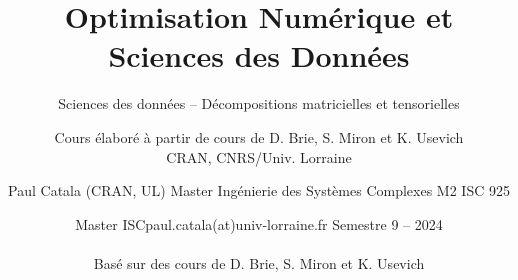 \documentclass[9pt]{beamer}
\author{Cours élaboré à partir de cours de D. Brie, S. Miron et K. Usevich \\CRAN, CNRS/Univ. Lorraine  }
\title{Optimisation Numérique et Sciences des Données}
\subtitle{Sciences des données -- Décompositions matricielles et tensorielles}
\date{Master ISC}
\author{Paul Catala (CRAN, UL) \hfill Master Ingénierie des Systèmes Complexes M2 ISC 925}
\date{paul.catala(at)univ-lorraine.fr \hfill Semestre 9 -- 2024 \\ \\ Basé sur des cours de D. Brie, S. Miron et K. Usevich}
\def\nvar{\mathrm{q}}
\begin{document}


\newcommand{\toclesssection}[1]{
  \setboolean{sectiontoc}{false}
  \section{#1}
  \setboolean{sectiontoc}{true}
}





\makeatletter
\newcommand{\xdashrightarrow}[2][]{\ext@arrow 0359\rightarrowfill@@{#1}{#2}}
\newcommand{\xdashleftarrow}[2][]{\ext@arrow 3095\leftarrowfill@@{#1}{#2}}
\newcommand{\xdashleftrightarrow}[2][]{\ext@arrow 3359\leftrightarrowfill@@{#1}{#2}}
\def\rightarrowfill@@{\arrowfill@@\relax\relbar\rightarrow}
\def\leftarrowfill@@{\arrowfill@@\leftarrow\relbar\relax}
\def\leftrightarrowfill@@{\arrowfill@@\leftarrow\relbar\rightarrow}
\def\arrowfill@@#1#2#3#4{%
  $\m@th\thickmuskip0mu\medmuskip\thickmuskip\thinmuskip\thickmuskip
   \relax#4#1
   \xleaders\hbox{$#4#2$}\hfill
   #3$%
}
\makeatother


\renewcommand{\nvar}{n}

\begin{frame}[t,plain]
\titlepage
\end{frame}
\end{document}
